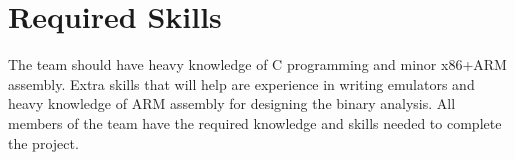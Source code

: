 \documentclass[12pt, a4paper]{article}
\begin{document}
\section{Required Skills}
The team should have heavy knowledge of C programming and minor x86+ARM assembly. Extra skills that will help are experience in writing emulators and heavy knowledge of ARM assembly for designing the binary analysis. All members of the team have the required knowledge and skills needed to complete the project.
\end{document}
